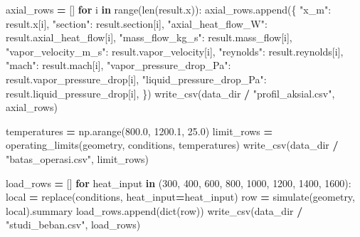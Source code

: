 \documentclass[
  12pt,a4paper,oneside]{report}
\newenvironment{Shaded}{\begin{snugshade}}{\end{snugshade}}
\newcommand{\BuiltInTok}[1]{#1}
\newcommand{\ControlFlowTok}[1]{\textcolor[rgb]{0.13,0.29,0.53}{\textbf{#1}}}
\newcommand{\DecValTok}[1]{\textcolor[rgb]{0.00,0.00,0.81}{#1}}
\newcommand{\FloatTok}[1]{\textcolor[rgb]{0.00,0.00,0.81}{#1}}
\newcommand{\KeywordTok}[1]{\textcolor[rgb]{0.13,0.29,0.53}{\textbf{#1}}}
\newcommand{\NormalTok}[1]{#1}
\newcommand{\OperatorTok}[1]{\textcolor[rgb]{0.81,0.36,0.00}{\textbf{#1}}}
\newcommand{\StringTok}[1]{\textcolor[rgb]{0.31,0.60,0.02}{#1}}
\begin{document}
\begin{Shaded}
\begin{Highlighting}[]
\NormalTok{    axial\_rows }\OperatorTok{=}\NormalTok{ []}
    \ControlFlowTok{for}\NormalTok{ i }\KeywordTok{in} \BuiltInTok{range}\NormalTok{(}\BuiltInTok{len}\NormalTok{(result.x)):}
\NormalTok{        axial\_rows.append(\{}
            \StringTok{"x\_m"}\NormalTok{: result.x[i], }\StringTok{"section"}\NormalTok{: result.section[i],}
            \StringTok{"axial\_heat\_flow\_W"}\NormalTok{: result.axial\_heat\_flow[i],}
            \StringTok{"mass\_flow\_kg\_s"}\NormalTok{: result.mass\_flow[i],}
            \StringTok{"vapor\_velocity\_m\_s"}\NormalTok{: result.vapor\_velocity[i],}
            \StringTok{"reynolds"}\NormalTok{: result.reynolds[i], }\StringTok{"mach"}\NormalTok{: result.mach[i],}
            \StringTok{"vapor\_pressure\_drop\_Pa"}\NormalTok{: result.vapor\_pressure\_drop[i],}
            \StringTok{"liquid\_pressure\_drop\_Pa"}\NormalTok{: result.liquid\_pressure\_drop[i],}
\NormalTok{        \})}
\NormalTok{    write\_csv(data\_dir }\OperatorTok{/} \StringTok{"profil\_aksial.csv"}\NormalTok{, axial\_rows)}

\NormalTok{    temperatures }\OperatorTok{=}\NormalTok{ np.arange(}\FloatTok{800.0}\NormalTok{, }\FloatTok{1200.1}\NormalTok{, }\FloatTok{25.0}\NormalTok{)}
\NormalTok{    limit\_rows }\OperatorTok{=}\NormalTok{ operating\_limits(geometry, conditions, temperatures)}
\NormalTok{    write\_csv(data\_dir }\OperatorTok{/} \StringTok{"batas\_operasi.csv"}\NormalTok{, limit\_rows)}

\NormalTok{    load\_rows }\OperatorTok{=}\NormalTok{ []}
    \ControlFlowTok{for}\NormalTok{ heat\_input }\KeywordTok{in}\NormalTok{ (}\DecValTok{300}\NormalTok{, }\DecValTok{400}\NormalTok{, }\DecValTok{600}\NormalTok{, }\DecValTok{800}\NormalTok{, }\DecValTok{1000}\NormalTok{, }\DecValTok{1200}\NormalTok{, }\DecValTok{1400}\NormalTok{, }\DecValTok{1600}\NormalTok{):}
\NormalTok{        local }\OperatorTok{=}\NormalTok{ replace(conditions, heat\_input}\OperatorTok{=}\NormalTok{heat\_input)}
\NormalTok{        row }\OperatorTok{=}\NormalTok{ simulate(geometry, local).summary}
\NormalTok{        load\_rows.append(}\BuiltInTok{dict}\NormalTok{(row))}
\NormalTok{    write\_csv(data\_dir }\OperatorTok{/} \StringTok{"studi\_beban.csv"}\NormalTok{, load\_rows)}


\end{Highlighting}
\end{Shaded}
\end{document}
